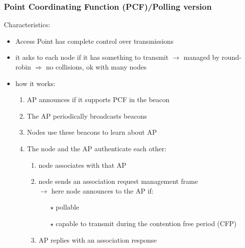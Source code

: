 \subsubsection{Point Coordinating Function (PCF)/Polling version}
Characteristics:
\begin{itemize}
    \item Access Point has complete control over transmissions
    \item it asks to each node if it has something to transmit $\rightarrow$ managed by round-robin
    $\Rightarrow$ no collisions, ok with many nodes
    \item how it works:
    \begin{enumerate}
        \item AP announces if it supports PCF in the beacon
        \item The AP periodically broadcasts beacons
        \item Nodes use these beacons to learn about AP
        \item The node and the AP authenticate each other:
        \begin{enumerate}
            \item node associates with that AP
            \item node sends an association request management frame\\
            $\rightarrow$ here node announces to the AP if:
            \begin{itemize}
                \item[$\star$] pollable
                \item[$\star$] capable to transmit during the contention free period (CFP)
            \end{itemize}
            \item AP replies with an association response
        \end{enumerate}
    \end{enumerate}
\end{itemize}

